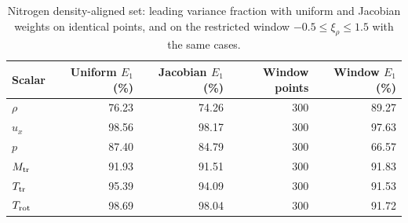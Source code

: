 \begin{table}
\centering\small
\caption{Nitrogen density-aligned set: leading variance fraction with uniform and Jacobian weights on identical points, and on the restricted window $-0.5\leq\xi_\rho\leq1.5$ with the same cases.}\label{tab:app_weight_window_compact}
\begin{tabular}{lrrrr}\toprule
Scalar & Uniform $E_1$ (\%) & Jacobian $E_1$ (\%) & Window points & Window $E_1$ (\%)\\\midrule
$\rho$ & 76.23 & 74.26 & 300 & 89.27\\
$u_x$ & 98.56 & 98.17 & 300 & 97.63\\
$p$ & 87.40 & 84.79 & 300 & 66.57\\
$M_{\rm tr}$ & 91.93 & 91.51 & 300 & 91.83\\
$T_{\rm tr}$ & 95.39 & 94.09 & 300 & 91.53\\
$T_{\rm rot}$ & 98.69 & 98.04 & 300 & 91.72\\
\bottomrule\end{tabular}
\end{table}

